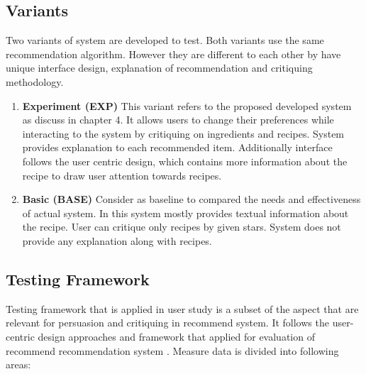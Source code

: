 \subsection{Variants}
Two variants of system are developed to test. Both variants use the same recommendation algorithm. However they are different to each other by have unique interface design, explanation of recommendation and critiquing methodology. 
\begin{enumerate}
	\item \textbf{Experiment (EXP)} This variant refers to the proposed developed system as discuss in chapter 4. It allows users to change their preferences while interacting to the system by critiquing on ingredients and recipes. System provides explanation to each recommended item. Additionally interface follows the user centric design, which contains more information about the recipe to draw user attention towards recipes.
	
	\item \textbf{Basic (BASE)}  Consider as baseline to compared the needs and effectiveness of actual system. In this system mostly provides textual information about the recipe. User can critique only recipes by given stars. System does not provide any explanation along with recipes. 
\end{enumerate}
\subsection{Testing Framework}
Testing framework that is applied in user study is a subset of the aspect that are relevant for persuasion and critiquing in recommend system. It follows the user-centric design approaches \cite{pu2006trust} and framework that applied for evaluation of recommend recommendation system \cite{shani2011evaluating}. Measure data is divided into following areas:
